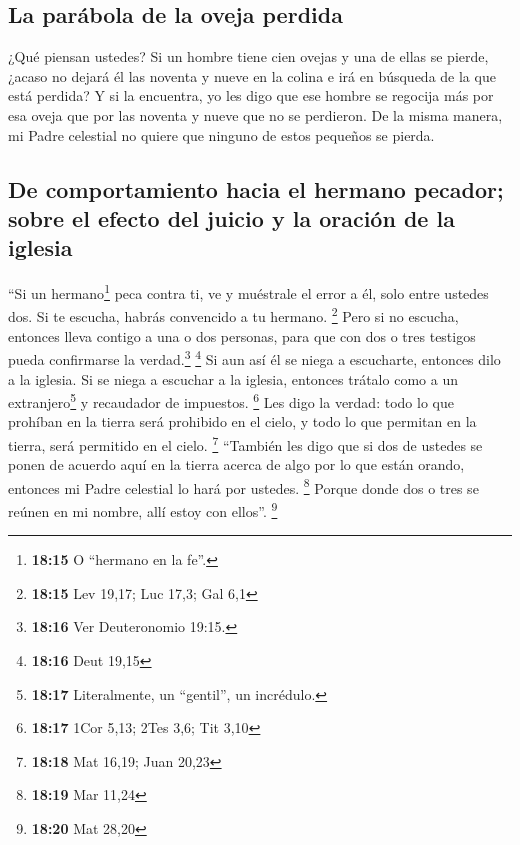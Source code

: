 \hypertarget{la-paruxe1bola-de-la-oveja-perdida}{%
\subsection{La parábola de la oveja
perdida}\label{la-paruxe1bola-de-la-oveja-perdida}}

 ¿Qué piensan ustedes? Si un hombre tiene cien ovejas y
una de ellas se pierde, ¿acaso no dejará él las noventa y nueve en la
colina e irá en búsqueda de la que está perdida?  Y si la
encuentra, yo les digo que ese hombre se regocija más por esa oveja que
por las noventa y nueve que no se perdieron.  De la misma
manera, mi Padre celestial no quiere que ninguno de estos pequeños se
pierda.

\hypertarget{de-comportamiento-hacia-el-hermano-pecador-sobre-el-efecto-del-juicio-y-la-oraciuxf3n-de-la-iglesia}{%
\subsection{De comportamiento hacia el hermano pecador; sobre el efecto
del juicio y la oración de la
iglesia}\label{de-comportamiento-hacia-el-hermano-pecador-sobre-el-efecto-del-juicio-y-la-oraciuxf3n-de-la-iglesia}}

 ``Si un hermano\footnote{\textbf{18:15} O ``hermano en
  la fe''.} peca contra ti, ve y muéstrale el error a él, solo entre
ustedes dos. Si te escucha, habrás convencido a tu hermano. \footnote{\textbf{18:15}
  Lev 19,17; Luc 17,3; Gal 6,1}  Pero si no escucha,
entonces lleva contigo a una o dos personas, para que con dos o tres
testigos pueda confirmarse la verdad.\footnote{\textbf{18:16} Ver
  Deuteronomio 19:15.} \footnote{\textbf{18:16} Deut 19,15}
 Si aun así él se niega a escucharte, entonces dilo a la
iglesia. Si se niega a escuchar a la iglesia, entonces trátalo como a un
extranjero\footnote{\textbf{18:17} Literalmente, un ``gentil'', un
  incrédulo.} y recaudador de impuestos. \footnote{\textbf{18:17} 1Cor
  5,13; 2Tes 3,6; Tit 3,10}  Les digo la verdad: todo lo
que prohíban en la tierra será prohibido en el cielo, y todo lo que
permitan en la tierra, será permitido en el cielo. \footnote{\textbf{18:18}
  Mat 16,19; Juan 20,23}  ``También les digo que si dos
de ustedes se ponen de acuerdo aquí en la tierra acerca de algo por lo
que están orando, entonces mi Padre celestial lo hará por ustedes.
\footnote{\textbf{18:19} Mar 11,24}  Porque donde dos o
tres se reúnen en mi nombre, allí estoy con ellos''. \footnote{\textbf{18:20}
  Mat 28,20}

